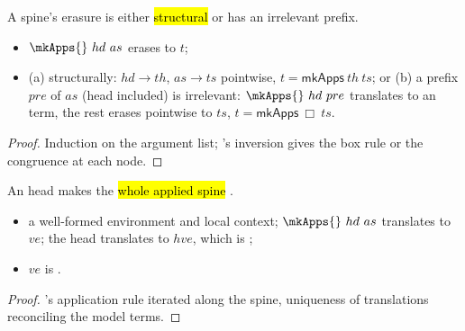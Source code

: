 \begin{lemma}
\label{lem:erases_mkApps_inv}
\leanok
{}
 A spine's erasure is either \hl{structural} or has an irrelevant prefix.
\begin{itemize}
\item {} $\mkApps{}\ hd\ as$ erases to $t$;
\item {} (a) structurally: $hd\to th$, $as\to ts$ pointwise, $t = \mathsf{mkApps}\ th\ ts$; or
(b) a prefix $pre$ of $as$ (head included) is irrelevant: $\mkApps{}\ hd\ pre$ translates to an
\Erasable{} term, the rest erases pointwise to $ts$, $t = \mathsf{mkApps}\ \Box\ ts$.
\end{itemize}
\end{lemma}
\begin{proof}
\leanok
{}
 Induction on the argument list; \Erases{}'s inversion gives the box rule or the congruence at
each node.
\end{proof}

\begin{lemma}
\label{lem:erasable_mkApps}
\leanok
{}
 An \Erasable{} head makes the \hl{whole applied spine} \Erasable{}.
\begin{itemize}
\item {} a well-formed environment and local context; $\mkApps{}\ hd\ as$ translates to $ve$;
the head translates to $hve$, which is \Erasable{};
\item {} $ve$ is \Erasable{}.
\end{itemize}
\end{lemma}
\begin{proof}
\leanok
{}
 \Erasable{}'s application rule iterated along the spine, uniqueness of translations
reconciling the model terms.
\end{proof}

